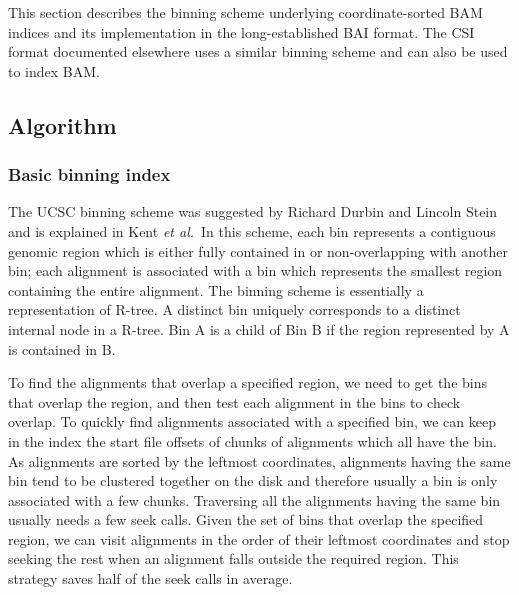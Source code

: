 \documentclass[10pt]{article}
\begin{document}
This section describes the binning scheme underlying coordinate-sorted
BAM indices and its implementation in the long-established BAI format.
The CSI format documented elsewhere uses a similar binning scheme and
can also be used to index BAM.\footnotemark


\subsection{Algorithm}
\subsubsection{Basic binning index}
The UCSC binning scheme was suggested by Richard Durbin and Lincoln Stein
and is explained in Kent {\it et al.}\footnotemark\ In this scheme, each bin
represents a contiguous genomic region which is either fully contained
in or non-overlapping with another bin; each alignment is associated
with a bin which represents the smallest region containing the entire
alignment. The binning scheme is essentially a representation of
R-tree. A distinct bin uniquely corresponds to a distinct internal node
in a R-tree. Bin A is a child of Bin B if the region represented by A is
contained in B.


To find the alignments that overlap a specified region, we need to get
the bins that overlap the region, and then test each alignment in the
bins to check overlap. To quickly find alignments associated with a
specified bin, we can keep in the index the start file offsets of chunks
of alignments which all have the bin. As alignments are sorted by the
leftmost coordinates, alignments having the same bin tend to be
clustered together on the disk and therefore usually a bin is only
associated with a few chunks. Traversing all the alignments having the
same bin usually needs a few seek calls. Given the set of bins that
overlap the specified region, we can visit alignments in the order of
their leftmost coordinates and stop seeking the rest when an alignment
falls outside the required region. This strategy saves half of the seek
calls in average.
\end{document}
